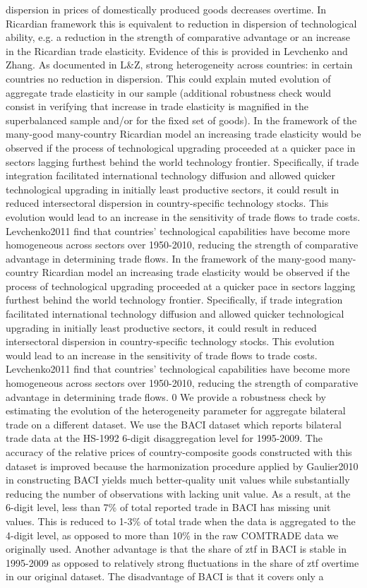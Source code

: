 \documentclass[12pt,twoside,a4paper,notitlepage]{article}
\begin{document}
{dispersion in prices of domestically produced goods decreases overtime. In Ricardian framework this is equivalent to reduction in dispersion of technological ability, e.g. a reduction in the strength of comparative advantage or an increase in the Ricardian trade elasticity. Evidence of this is provided in Levchenko and Zhang. As documented in L\&Z, strong heterogeneity across countries: in certain countries no reduction in dispersion. This could explain muted evolution of aggregate trade elasticity in our sample (additional robustness check would consist in verifying that increase in trade elasticity is magnified in the superbalanced sample and/or for the fixed set of goods). In the framework of the many-good many-country Ricardian model an increasing trade elasticity would be observed if the process of technological upgrading proceeded at a quicker pace in sectors lagging furthest behind the world technology frontier. Specifically, if trade integration facilitated international technology diffusion and allowed quicker technological upgrading in initially least productive sectors, it could result in reduced intersectoral dispersion in country-specific technology stocks. This evolution would lead to an increase in the sensitivity of trade flows to trade costs. Levchenko2011 find that countries' technological capabilities have become more homogeneous across sectors over 1950-2010, reducing the strength of comparative advantage in determining trade flows. In the framework of the many-good many-country Ricardian model an increasing trade elasticity would be observed if the process of technological upgrading proceeded at a quicker pace in sectors lagging furthest behind the world technology frontier. Specifically, if trade integration facilitated international technology diffusion and allowed quicker technological upgrading in initially least productive sectors, it could result in reduced intersectoral dispersion in country-specific technology stocks. This evolution would lead to an increase in the sensitivity of trade flows to trade costs. Levchenko2011 find that countries' technological capabilities have become more homogeneous across sectors over 1950-2010, reducing the strength of comparative advantage in determining trade flows. 0 We provide a robustness check by estimating the evolution of the heterogeneity parameter for aggregate bilateral trade on a different dataset. We use the BACI dataset which reports bilateral trade data at the HS-1992 6-digit disaggregation level for 1995-2009. The accuracy of the relative prices of country-composite goods constructed with this dataset is improved because the harmonization procedure applied by Gaulier2010 in constructing BACI yields much better-quality unit values while substantially reducing the number of observations with lacking unit value. As a result, at the 6-digit level, less than 7\% of total reported trade in BACI has missing unit values. This is reduced to 1-3\% of total trade when the data is aggregated to the 4-digit level, as opposed to more than 10\% in the raw COMTRADE data we originally used. Another advantage is that the share of ztf in BACI is stable in 1995-2009 as opposed to relatively strong fluctuations in the share of ztf overtime in our original dataset. The disadvantage of BACI is that it covers only a }
\end{document}
